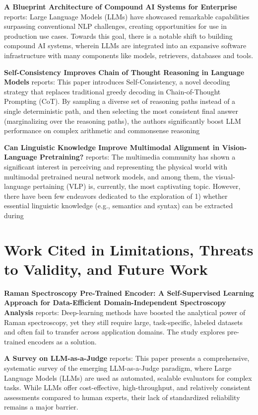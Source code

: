 \documentclass[10pt,twocolumn,letterpaper]{article}
\begin{document}
\textbf{A Blueprint Architecture of Compound AI Systems for Enterprise} \cite{arxiv_2406_00584} reports: Large Language Models (LLMs) have showcased remarkable capabilities surpassing conventional NLP challenges, creating opportunities for use in production use cases. Towards this goal, there is a notable shift to building compound AI systems, wherein LLMs are integrated into an expansive software infrastructure with many components like models, retrievers, databases and tools.

\textbf{Self-Consistency Improves Chain of Thought Reasoning in Language Models} \cite{arxiv_2203_11171} reports: This paper introduces Self-Consistency, a novel decoding strategy that replaces traditional greedy decoding in Chain-of-Thought Prompting (CoT). By sampling a diverse set of reasoning paths instead of a single deterministic path, and then selecting the most consistent final answer (marginalizing over the reasoning paths), the authors significantly boost LLM performance on complex arithmetic and commonsense reasoning 

\textbf{Can Linguistic Knowledge Improve Multimodal Alignment in Vision-Language Pretraining?} \cite{arxiv_2308_12898} reports: The multimedia community has shown a significant interest in perceiving and representing the physical world with multimodal pretrained neural network models, and among them, the visual-language pertaining (VLP) is, currently, the most captivating topic. However, there have been few endeavors dedicated to the exploration of 1) whether essential linguistic knowledge (e.g., semantics and syntax) can be extracted during 


\section{Work Cited in Limitations, Threats to Validity, and Future Work}


\textbf{Raman Spectroscopy Pre-Trained Encoder: A Self-Supervised Learning Approach for Data-Efficient Domain-Independent Spectroscopy Analysis} \cite{doaj_001772c2113c476d9d5d40452c8e10e1} reports: Deep-learning methods have boosted the analytical power of Raman spectroscopy, yet they still require large, task-specific, labeled datasets and often fail to transfer across application domains. The study explores pre-trained encoders as a solution.

\textbf{A Survey on LLM-as-a-Judge} \cite{arxiv_2411_15594} reports: This paper presents a comprehensive, systematic survey of the emerging LLM-as-a-Judge paradigm, where Large Language Models (LLMs) are used as automated, scalable evaluators for complex tasks. While LLMs offer cost-effective, high-throughput, and relatively consistent assessments compared to human experts, their lack of standardized reliability remains a major barrier.
\end{document}
